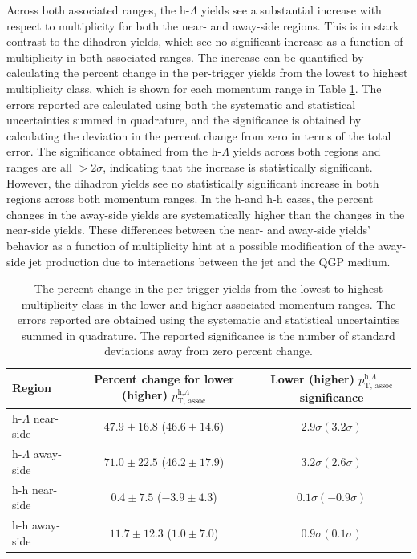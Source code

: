 Across both associated \pt ranges, the h-$\Lambda$ yields see a substantial increase with respect to multiplicity for both the near- and away-side regions. This is in stark contrast to the dihadron yields, which see no significant increase as a function of multiplicity in both associated \pt ranges.  The increase can be quantified by calculating the percent change in the per-trigger yields from the lowest to highest multiplicity class, which is shown for each momentum range in Table \ref{tab:percent_increase}. The errors reported are calculated using both the systematic and statistical uncertainties summed in quadrature, and the significance is obtained by calculating the deviation in the percent change from zero in terms of the total error. The significance obtained from the h-$\Lambda$ yields across both regions and \pt ranges are all $>2\sigma$, indicating that the increase is statistically significant. However, the dihadron yields see no statistically significant increase in both regions across both momentum ranges. In the h-\lmb and h-h cases, the percent changes in the away-side yields are systematically higher than the changes in the near-side yields. These differences between the near- and away-side yields' behavior as a function of multiplicity hint at a possible modification of the away-side jet production due to interactions between the jet and the QGP medium.

\begin{table}
\centering
\caption{The percent change in the per-trigger yields from the lowest to highest multiplicity class in the lower and higher associated momentum ranges. The errors reported are obtained using the systematic and statistical uncertainties summed in quadrature. The reported significance is the number of standard deviations away from zero percent change.}
\begin{tabular}{l c c}
\hline
Region & Percent change for lower (higher) $p_{\text{T, assoc}}^{\text{h,}\Lambda}$ & Lower (higher) $p_{\text{T, assoc}}^{\text{h,}\Lambda}$ significance \\
\hline
h-$\Lambda$ near-side &  $47.9 \pm 16.8$ ($46.6 \pm 14.6$) & $ 2.9\sigma (3.2\sigma) $\\ 
h-$\Lambda$ away-side &  $71.0 \pm 22.5$ ($46.2 \pm 17.9$) & $3.2\sigma (2.6\sigma)$ \\
h-h near-side &  $ 0.4 \pm 7.5$ ($-3.9 \pm 4.3$) & $0.1\sigma (-0.9\sigma)$ \\
h-h away-side &  $11.7 \pm 12.3$ ($1.0 \pm 7.0$) & $0.9\sigma (0.1\sigma)$ \\
\hline
\end{tabular}
\label{tab:percent_increase}
\end{table}

